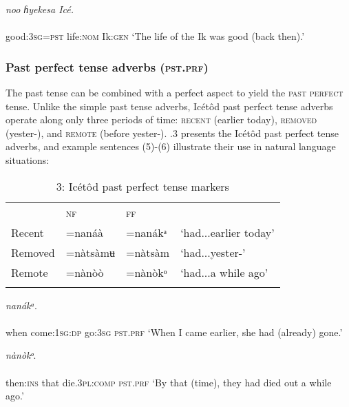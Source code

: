 \ea\label{ex:}
 \textit{noo}\textit{   ɦyekesa   Icé.} \\
    \\
good:\textsc{3sg}=\textsc{pst}   life:\textsc{nom}   Ik:\textsc{gen}
\glt ‘The life of the Ik was good (back then).’ 
\z




\subsubsection{Past perfect tense adverbs (\textsc{pst.prf})}

The past tense can be combined with a perfect aspect to yield the \textsc{past perfect} tense. Unlike the simple past tense adverbs, Icétôd past perfect tense adverbs operate along only three periods of time: \textsc{recent} (earlier today), \textsc{removed} (yester-), and \textsc{remote} (before yester-). .3 presents the Icétôd past perfect tense adverbs, and example sentences (5)-(6) illustrate their use in natural language situations:


\begin{table}
\caption{3: Icétôd past perfect tense markers}
\label{tab:9}


\begin{tabularx}{\textwidth}{XXXX} & \textsc{nf} & \textsc{ff} & \\
\lsptoprule
Recent & =nanáà & =nanákᵃ & ‘had...earlier today’\\
Removed & =nàtsàmʉ & =nàtsàm & ‘had...yester-’\\
Remote & =nànòò & =nànòkᵒ & ‘had...a while ago’\\
\lspbottomrule
\end{tabularx}
\end{table}



\ea\label{ex:}
     \textit{nanákᵃ}. \\
    \\
when  come:\textsc{1sg:dp}   go:\textsc{3sg}   \textsc{pst.prf}
\glt ‘When I came earlier, she had (already) gone.’ 
\z




\ea\label{ex:}
     \textit{nànòkᵒ}. \\
    \\
then:\textsc{ins}   that   die.\textsc{3pl:comp}   \textsc{pst.prf}
\glt ‘By that (time), they had died out a while ago.’ 
\z




